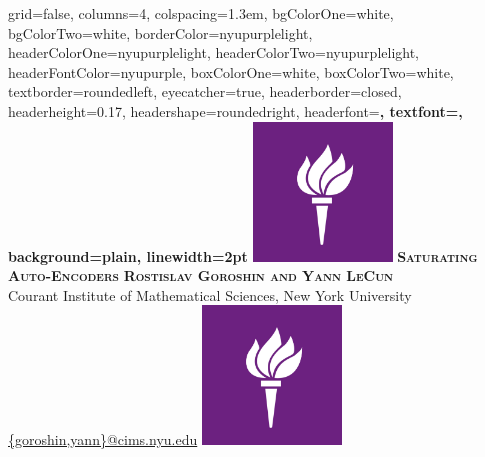 \documentclass[paperwidth=38in,paperheight=28in,landscape,fontscale=0.4]{baposter}
\begin{document}
\begin{poster}%
  {
  grid=false,
  columns=4,
  colspacing=1.3em,
  bgColorOne=white,
  bgColorTwo=white,
  borderColor=nyupurplelight,
  headerColorOne=nyupurplelight,
  headerColorTwo=nyupurplelight,
  headerFontColor=nyupurple,
  boxColorOne=white,
  boxColorTwo=white,
 textborder=roundedleft,
  eyecatcher=true,
  headerborder=closed,
  headerheight=0.17\textheight,
  headershape=roundedright,
  headerfont=\Large\bf\textsc, %
  textfont={\setlength{\parindent}{0em}},
  background=plain,
  linewidth=2pt
  }
  { \includegraphics[height=10.0em]{torch2.jpg}
   } 
  {\vspace{0.2em}\bf\textsc{
  Saturating Auto-Encoders
  }
  \vspace{0.4em}
  }
  {{\bf\textsc{Rostislav Goroshin and Yann LeCun}}
  \\ %
  Courant Institute of Mathematical Sciences, 
  New York University
  \\
  \url{{goroshin,yann}@cims.nyu.edu}
}
  {%
    \includegraphics[height=10.0em]{torch2.jpg}
  }
  

\end{poster}
\end{document}
